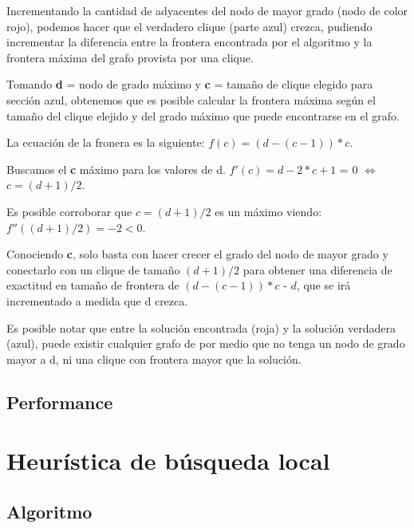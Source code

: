 \documentclass[a4paper, 10pt, twoside]{article}
\begin{document}
Incrementando la cantidad de adyacentes del nodo de mayor grado (nodo de color rojo), podemos hacer que el verdadero clique (parte azul) crezca, pudiendo incrementar la diferencia entre la frontera encontrada por el algoritmo y la frontera máxima del grafo provista por una clique.

Tomando \textbf{d} = nodo de grado máximo y \textbf{c} = tamaño de clique elegido para sección azul, obtenemos que es posible calcular la frontera máxima según el tamaño del clique elejido y del grado máximo que puede encontrarse en el grafo.

La ecuación de la fronera es la siguiente: $f(c) = (d - (c - 1)) * c$.

Buscamos el \textbf{c} máximo para los valores de d. $f'(c) = d - 2 * c + 1$ = 0 $\Leftrightarrow$ $c = (d + 1)/2$.

Es posible corroborar que $c = (d + 1)/2$ es un máximo viendo: $f''((d + 1)/2) = -2 < 0$.

Conociendo \textbf{c}, solo basta con hacer crecer el grado del nodo de mayor grado y conectarlo con un clique de tamaño $(d + 1)/2$ para obtener una diferencia de exactitud en tamaño de frontera de $(d - (c - 1)) * c$ - $d$, que se irá incrementado a medida que d crezca.

Es posible notar que entre la solución encontrada (roja) y la solución verdadera (azul), puede existir cualquier grafo de por medio que no tenga un nodo de grado mayor a d, ni una clique con frontera mayor que la solución.

\subsection{Performance}


\newpage

\section{Heurística de búsqueda local}
\subsection{Algoritmo}
\end{document}
